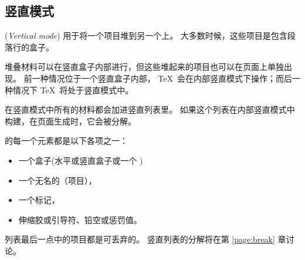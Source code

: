\documentclass{book}
\begin{document}
\subsection{竖直模式}

(\emph{Vertical mode})
用于将一个项目堆到另一个上。
大多数时候，这些项目是包含段落行的盒子。

堆叠材料可以在竖直盒子内部进行，但这些堆起来的项目也可以在页面上单独出现。
前一种情况位于一个竖直盒子内部，
\TeX\ 会在内部竖直模式下操作；而后一种情况下 \TeX\ 将处于竖直模式中。

在竖直模式中所有的材料都会加进竖直列表里。
如果这个列表在内部竖直模式中构建，在页面生成时，它会被分解。

的每一个元素都是以下各项之一：
\begin{itemize}
  \item 一个盒子(水平或竖直盒子或一个 )
  \item 一个无名的（项目），
  \item 一个标记，
  \item 伸缩胶或引导符、铅空或惩罚值。
\end{itemize}
列表最后一点中的项目都是可丢弃的。
竖直列表的分解将在第 \ref{page:break} 章讨论。
\end{document}
